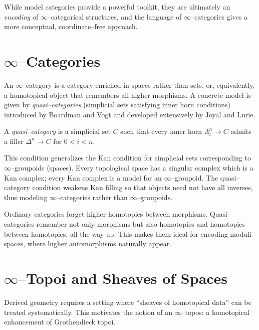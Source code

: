 While model categories provide a powerful toolkit, they are ultimately an
\emph{encoding} of $\infty$--categorical structures, and the language of
$\infty$--categories gives a more conceptual, coordinate--free approach.

\section{\texorpdfstring{$\infty$}{Infinity}--Categories}

An $\infty$--category is a category enriched in spaces rather than sets, or,
equivalently, a homotopical object that remembers all higher morphisms. A
concrete model is given by \emph{quasi--categories} (simplicial sets
satisfying inner horn conditions) introduced by Boardman and Vogt and
developed extensively by Joyal and Lurie.

\begin{definition}
A \emph{quasi--category} is a simplicial set $C$ such that every inner
horn $\Lambda^n_i \to C$ admits a filler $\Delta^n\to C$ for $0 < i < n$.
\end{definition}

This condition generalizes the Kan condition for simplicial sets
corresponding to $\infty$--groupoids (spaces). Every topological space has a
singular complex which is a Kan complex; every Kan complex is a model for an
$\infty$--groupoid. The quasi--category condition weakens Kan filling so that
objects need not have all inverses, thus modeling $\infty$--categories rather
than $\infty$--groupoids.

\Intuition
Ordinary categories forget higher homotopies between morphisms. Quasi--categories
remember not only morphisms but also homotopies and homotopies between homotopies,
all the way up. This makes them ideal for encoding moduli spaces, where higher
automorphisms naturally appear.

\section{$\infty$--Topoi and Sheaves of Spaces}

Derived geometry requires a setting where ``sheaves of homotopical data'' can
be treated systematically. This motivates the notion of an $\infty$--topos:
a homotopical enhancement of Grothendieck topoi.

